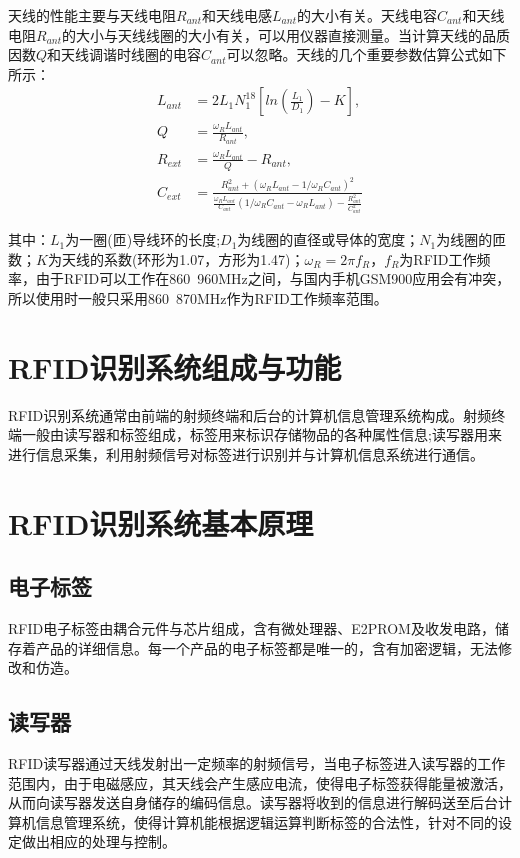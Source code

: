 \documentclass[a4paper]{ctexart}
\begin{document}
\begin{spacing}{1.5}
天线的性能主要与天线电阻$R_{ant}$和天线电感$L_{ant}$的大小有关。天线电容$C_{ant}$和天线电阻$R_{ant}$的大小与天线线圈的大小有关，可以用仪器直接测量。当计算天线的品质因数$Q$和天线调谐时线圈的电容$C_{ant}$可以忽略。天线的几个重要参数估算公式如下所示：
\begin{equation}
\begin{split}
L_{ant}&=2L_{1}N_{1}^{18}[ln(\frac{L_{1}}{D_{1}})-K],\\
Q&=\frac{\omega_{R}L_{ant}}{R_{ant}},\\
R_{ext}&=\frac{\omega_{R}L_{ant}}{Q}-R_{ant},\\
C_{ext}&=\frac{R_{ant}^{2}+(\omega_{R}L_{ant}-1/\omega_{R}C_{ant})^{2}}{\frac{\omega_{R}L_{ant}}{C_{ant}}(1/\omega_{R}C_{ant}-\omega_{R}L_{ant})-\frac{R_{ant}^{2}}{C_{ant}^{2}}}
\end{split}
\end{equation}

其中：$L_{1}$为一圈(匝)导线环的长度;$D_{1}$为线圈的直径或导体的宽度；$N_{1}$为线圈的匝数；$K$为天线的系数(环形为1.07，方形为1.47)；$\omega_{R}=2\pi f_{R}$，$f_{R}$为RFID工作频率，由于RFID可以工作在860~960MHz之间，与国内手机GSM900应用会有冲突，所以使用时一般只采用860~870MHz作为RFID工作频率范围。

\section{RFID识别系统组成与功能}
RFID识别系统通常由前端的射频终端和后台的计算机信息管理系统构成。射频终端一般由读写器和标签组成，标签用来标识存储物品的各种属性信息;读写器用来进行信息采集，利用射频信号对标签进行识别并与计算机信息系统进行通信。

\section{RFID识别系统基本原理}
\subsection{电子标签}
RFID电子标签由耦合元件与芯片组成，含有微处理器、E2PROM及收发电路，储存着产品的详细信息。每一个产品的电子标签都是唯一的，含有加密逻辑，无法修改和仿造。

\subsection{读写器}
RFID读写器通过天线发射出一定频率的射频信号，当电子标签进入读写器的工作范围内，由于电磁感应，其天线会产生感应电流，使得电子标签获得能量被激活，从而向读写器发送自身储存的编码信息。读写器将收到的信息进行解码送至后台计算机信息管理系统，使得计算机能根据逻辑运算判断标签的合法性，针对不同的设定做出相应的处理与控制。


\end{spacing}
\end{document}
